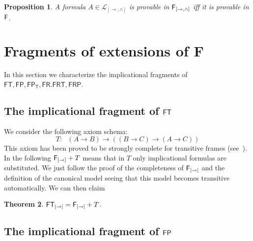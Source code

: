 \documentclass[12pt]{article}
\newtheorem{thm}{Theorem}[section]
\newtheorem{prop}[thm]{Proposition}
\newtheorem{lem}[thm]{Lemma}
\begin{document}
\begin{prop}
A formula $ A \in \mathcal{L}_{[\rightarrow, \wedge]} $ is provable in $ {\sf F_{[\rightarrow, \wedge]}}$ iff it is provable in ${\sf F}  $.
                                                  \end{prop}

\section{Fragments of extensions  of {\sf F}}\label{extf}

In this section we characterize the implicational fragments of $\mathsf{FT, FP, FP_T, FR. FRT, FRP}$.

\subsection{The implicational fragment of $ {\sf FT}  $}

We consider the following axiom schema:
$$T:~~~(A\rightarrow B)\rightarrow ((B\rightarrow C)\rightarrow (A\rightarrow C))      $$
This axiom has been proved to be strongly complete for transitive frames (see~\cite{DF2, Co}).
In the following ${\sf F}_{[\rightarrow]}+T$  means that in $  T $ only implicational formulas are substituted.
We just follow the proof of the completeness of $ {\sf F_{[\rightarrow]}} $ and the definition of the canonical model seeing that this model becomes transitive automatically. We can then claim


\begin{thm}
${\sf FT}_{[\rightarrow]}={\sf F}_{[\rightarrow]}+T$.
\end{thm}
\subsection{The implicational fragment of $ {\sf FP}  $}
\end{document}
